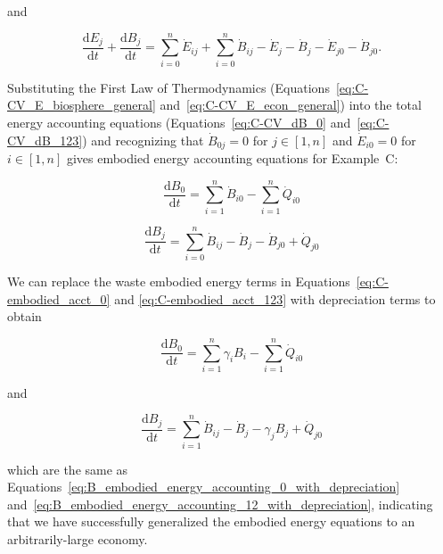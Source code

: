 \noindent and

\begin{equation} \label{eq:C-CV_dB_123}
	\frac{\mathrm{d}E_{j}}{\mathrm{d}t}
	+ \frac{\mathrm{d}B_{j}}{\mathrm{d}t} 	 
	= \sum\limits_{i=0}^{n} \dot{E}_{ij}
	+ \sum\limits_{i=0}^{n} \dot{B}_{ij}
	- \dot{E}_{j}
	- \dot{B}_{j}
	- \dot{E}_{j0}
	- \dot{B}_{j0}.
\end{equation}

Substituting the First Law of Thermodynamics 
(Equations~\ref{eq:C-CV_E_biosphere_general} and~\ref{eq:C-CV_E_econ_general}) 
into the total energy accounting equations 
(Equations~\ref{eq:C-CV_dB_0} and~\ref{eq:C-CV_dB_123}) 
and recognizing that $\dot{B}_{0j} = 0$ for $j \in [1, n]$
and $\dot{E}_{i0} = 0$ for $i \in [1, n]$
gives embodied energy accounting equations for Example~C: %

\begin{equation} \label{eq:C-embodied_acct_0}
	\frac{\mathrm{d}B_{0}}{\mathrm{d}t} 	 
	= \sum\limits_{i=1}^{n} \dot{B}_{i0}
	- \sum\limits_{i=1}^{n} \dot{Q}_{i0}
\end{equation}

\begin{equation} \label{eq:C-embodied_acct_123}
	\frac{\mathrm{d}B_{j}}{\mathrm{d}t} 	 
	= \sum\limits_{i=0}^{n} \dot{B}_{ij}
	- \dot{B}_{j}
	- \dot{B}_{j0}
	+ \dot{Q}_{j0} 
\end{equation}

We can replace the waste embodied energy terms in 
Equations~\ref{eq:C-embodied_acct_0} and 
\ref{eq:C-embodied_acct_123}
with depreciation terms to obtain

\begin{equation} \label{eq:C_embodied_energy_accounting_0_with_depreciation}
	\frac{\mathrm{d}B_{0}}{\mathrm{d}t} 
	= \sum\limits_{i=1}^n \gamma_{i}B_{i} 
	- \sum\limits_{i=1}^n\dot{Q}_{i0} 
\end{equation}

\noindent and

\begin{equation} \label{eq:C_embodied_energy_accounting_123_with_depreciation}
	\frac{\mathrm{d}B_{j}}{\mathrm{d}t} 
	= \sum\limits_{i=1}^n\dot{B}_{ij} 
	- \dot{B}_{j}
	- \gamma_{j} B_{j}
	+ \dot{Q}_{j0}
\end{equation}

\noindent which are the same as 
Equations~\ref{eq:B_embodied_energy_accounting_0_with_depreciation}
and~\ref{eq:B_embodied_energy_accounting_12_with_depreciation},
indicating that we have successfully generalized the embodied energy
equations to an arbitrarily-large economy.

